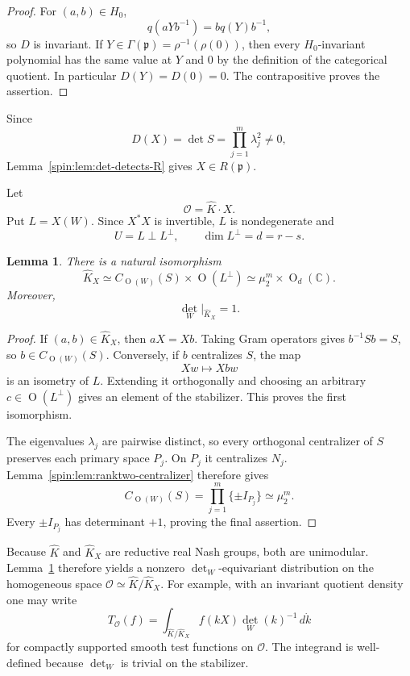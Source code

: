 \documentclass[11pt,reqno]{amsart}
\numberwithin{equation}{section}
\newtheorem{lemma}[theorem]{Lemma}
\theoremstyle{definition}
\theoremstyle{remark}
\newcommand{\C}{\mathbb C}
\newcommand{\Or}{\operatorname{O}}
\newcommand{\fp}{\mathfrak p}
\newcommand{\cO}{\mathcal O}
\begin{document}
\begin{proof}
For $(a,b)\in H_0$,
\[
  q(aYb^{-1})=bq(Y)b^{-1},
\]
so $D$ is invariant.  If $Y\in\Gamma(\fp)=\rho^{-1}(\rho(0))$, then every
$H_0$-invariant polynomial has the same value at $Y$ and $0$ by the
definition of the categorical quotient.  In particular $D(Y)=D(0)=0$.
The contrapositive proves the assertion.
\end{proof}

Since
\[
  D(X)=\det S=\prod_{j=1}^m\lambda_j^2\ne0,
\]
Lemma~\ref{spin:lem:det-detects-R} gives $X\in R(\fp)$.

Let
\[
  \cO=\widehat K\cdot X.
\]
Put $L=X(W)$.  Since $X^*X$ is invertible, $L$ is nondegenerate and
\[
  U=L\perp L^\perp,
  \qquad
  \dim L^\perp=d=r-s.
\]

\begin{lemma}\label{spin:lem:start-stabilizer}
There is a natural isomorphism
\[
  \widehat K_X
  \simeq
  C_{\Or(W)}(S)\times\Or(L^\perp)
  \simeq
  \mu_2^m\times\Or_d(\C).
\]
Moreover,
\[
  \det_W|_{\widehat K_X}=1.
\]
\end{lemma}

\begin{proof}
If $(a,b)\in\widehat K_X$, then $aX=Xb$.  Taking Gram operators gives
$b^{-1}Sb=S$, so $b\in C_{\Or(W)}(S)$.  Conversely, if $b$ centralizes $S$,
the map
\[
  Xw\longmapsto Xbw
\]
is an isometry of $L$.  Extending it orthogonally and choosing an arbitrary
$c\in\Or(L^\perp)$ gives an element of the stabilizer.  This proves the first
isomorphism.

The eigenvalues $\lambda_j$ are pairwise distinct, so every orthogonal
centralizer of $S$ preserves each primary space $P_j$.  On $P_j$ it centralizes
$N_j$.  Lemma~\ref{spin:lem:ranktwo-centralizer} therefore gives
\[
  C_{\Or(W)}(S)
  =\prod_{j=1}^m\{\pm I_{P_j}\}
  \simeq\mu_2^m.
\]
Every $\pm I_{P_j}$ has determinant $+1$, proving the final assertion.
\end{proof}

Because $\widehat K$ and $\widehat K_X$ are reductive real Nash groups, both
are unimodular.  Lemma~\ref{spin:lem:start-stabilizer} therefore yields a nonzero
$\det_W$-equivariant distribution on the homogeneous space
$\cO\simeq\widehat K/\widehat K_X$.  For example, with an invariant quotient
density one may write
\begin{equation}\label{spin:eq:orbital-integral}
  T_{\cO}(f)
  =\int_{\widehat K/\widehat K_X}
       f(kX)\det_W(k)^{-1}\,d\dot k
\end{equation}
for compactly supported smooth test functions on $\cO$.  The integrand is
well-defined because $\det_W$ is trivial on the stabilizer.
\end{document}
